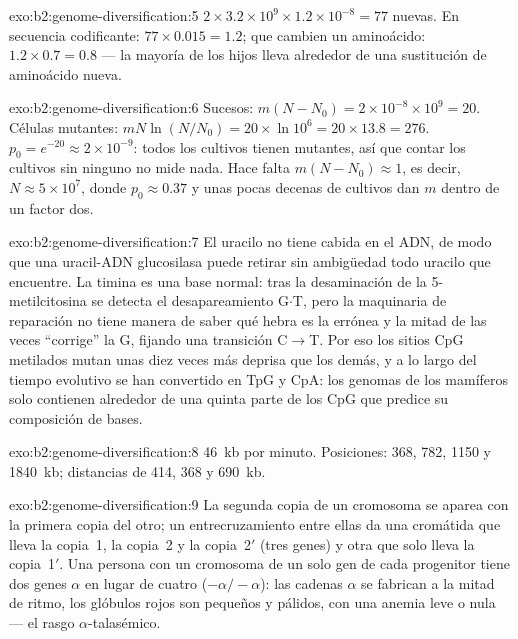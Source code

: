 \begin{solution}{exo:b2:genome-diversification:5}
$2\times 3.2\times 10^{9}\times 1.2\times 10^{-8} = 77$  nuevas.
En secuencia codificante: $77\times 0.015 = 1.2$; que cambien un
aminoácido: $1.2\times 0.7 = 0.8$ --- la mayoría de los hijos lleva
alrededor de una sustitución de aminoácido nueva.
\end{solution}

\begin{solution}{exo:b2:genome-diversification:6}
Sucesos: $m(N - N_0) = 2\times 10^{-8}\times 10^{9} = 20$. Células
mutantes: $mN\ln(N/N_0) = 20\times \ln 10^{6} = 20\times 13.8 = 276$.
$p_0 = e^{-20} \approx 2\times 10^{-9}$: todos los cultivos tienen
mutantes, así que contar los cultivos sin ninguno no mide nada. Hace
falta $m(N -
N_0) \approx 1$, es decir, $N \approx 5\times 10^{7}$, donde $p_0 \approx
0.37$ y unas pocas decenas de cultivos dan $m$ dentro de un factor dos.
\end{solution}

\begin{solution}{exo:b2:genome-diversification:7}
El uracilo no tiene cabida en el ADN, de modo que una uracil-ADN
glucosilasa puede retirar sin ambigüedad todo uracilo que encuentre. La
timina es una base normal: tras la desaminación de la 5-metilcitosina se
detecta el desapareamiento G$\cdot$T, pero la maquinaria de reparación no
tiene manera de saber qué hebra es la errónea y la mitad de las veces
``corrige'' la G, fijando una transición C$\to$T. Por eso los sitios CpG
metilados mutan unas diez veces más deprisa que los demás, y a lo largo
del tiempo evolutivo se han convertido en TpG y CpA: los genomas de los
mamíferos solo contienen alrededor de una quinta parte de los CpG que
predice su composición de bases.
\end{solution}

\begin{solution}{exo:b2:genome-diversification:8}
\qty{46}{kb} por minuto. Posiciones: 368, 782, 1150 y
\qty{1840}{kb}; distancias de 414, 368 y \qty{690}{kb}.
\end{solution}

\begin{solution}{exo:b2:genome-diversification:9}
La segunda copia de un cromosoma se aparea con la primera copia del
otro; un entrecruzamiento entre ellas da una cromátida que lleva la
copia~1, la copia~2 y la copia~2$'$ (tres genes) y otra que solo lleva la
copia~1$'$. Una persona con un cromosoma de un solo gen de cada
progenitor tiene dos genes $\alpha$ en lugar de cuatro ($-\alpha/-\alpha$):
las cadenas $\alpha$ se fabrican a la mitad de ritmo, los glóbulos rojos
son pequeños y pálidos, con una anemia leve o nula --- el rasgo
$\alpha$-talasémico.
\end{solution}

